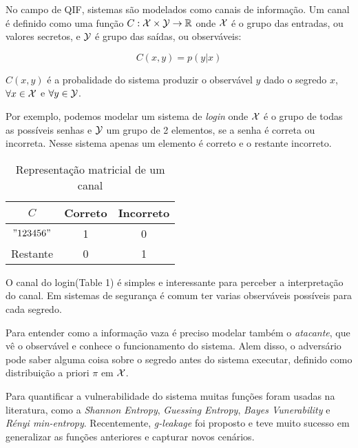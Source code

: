 No campo de QIF, sistemas são modelados como canais de informação. Um canal é definido como uma função $C: \mathcal{X} \times \mathcal{Y} \rightarrow \mathbb{R}$ onde $\mathcal{X}$ é o grupo das entradas, ou valores secretos, e $\mathcal{Y}$ é grupo das saídas, ou observáveis:

$$ C(x,y) = p(y|x) $$

$C(x,y)$ é a probalidade do sistema produzir o observável $y$ dado o segredo $x$, $\forall x \in \mathcal{X}$ e $\forall y \in \mathcal{Y}$.

Por exemplo, podemos modelar um sistema de \emph{login} onde $\mathcal{X}$ é o grupo de todas as possíveis senhas e $\mathcal{Y}$ um grupo de 2 elementos, se a senha é correta ou incorreta. Nesse sistema apenas um elemento é correto e o restante incorreto.
\begin{table}[h!]
\centering
\begin{tabular}{|c|c c|}
    \hline
    $C$   & Correto & Incorreto  \\
    \hline 
    $"123456"$&1&0\\
    Restante &0&1\\
    \hline
\end{tabular}
\caption{Representação matricial de um canal}
\label{Canal}
\end{table}
O canal do login(Table 1) é simples e interessante para perceber a interpretação do canal. Em sistemas de segurança é comum ter varias observáveis possíveis para cada segredo.

Para entender como a informação vaza é preciso modelar também o \emph{atacante}, que vê o observável e conhece o funcionamento do sistema. Alem disso, o adversário pode saber alguma coisa sobre o segredo antes do sistema executar, definido como distribuição a priori $\pi$ em $\mathcal{X}$.

Para quantificar a vulnerabilidade do sistema muitas funções foram usadas na literatura, como a \emph{Shannon Entropy}\cite{Shannon:48:Bell}, \emph{Guessing Entropy}\cite{Massey:94:IT}, \emph{Bayes Vunerability}\cite{Braun:09:MFPS} e \emph{Rényi min-entropy}\cite{Smith:09:FOSSACS}. Recentemente, \emph{g-leakage}\cite{Alvim:12:CSF} foi proposto e teve muito sucesso em generalizar as funções anteriores e capturar novos cenários.

